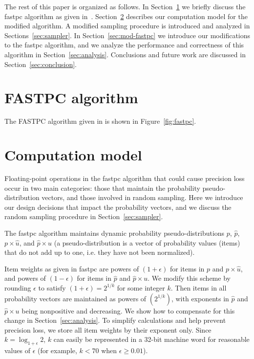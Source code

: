 \documentclass[11pt]{article}
\newcommand{\phat}{\hat{p}}
\newcommand{\phXu}{\hat{p} \times u}
\newcommand{\pXuh}{p \times \hat{u}}
\begin{document}
The rest of this paper is organized as follows.
 In Section~\ref{sec:fastpc} we briefly discuss the fastpc algorithm as given in~\cite{kouf2007}.
 Section~\ref{sec:model} describes our computation model for the modified algorithm. 
 A modified sampling procedure is introduced and analyzed in Sections~\ref{sec:sampler}.  
  In Section~\ref{sec:mod-fastpc} we introduce our modifications to the fastpc algorithm, 
  and we analyze the performance and correctness of this algorithm in Section~\ref{sec:analysis}.
 Conclusions and future work are discussed in Section~\ref{sec:conclusion}.

\section{FASTPC algorithm} \label{sec:fastpc}
The FASTPC algorithm given in \cite{kouf2007} is shown in Figure~\ref{fig:fastpc}.

\section{Computation model} \label{sec:model}

Floating-point operations in the fastpc algorithm that could cause precision loss occur in two main categories: those that maintain the probability pseudo-distribution vectors, and those involved in random sampling.  
Here we introduce our design decisions that impact the probability vectors, and we discuss the random sampling procedure in Section~\ref{sec:sampler}.

The fastpc algorithm maintains dynamic probability pseudo-distributions $p$, $\phat$, $\pXuh$, and $\phXu$ (a 
pseudo-distribution is a vector of probability values (items) that do not add
up to one, i.e. they have not been normalized).  

Item weights as given in fastpc are powers of $(1+\epsilon)$ for
items in $p$ and $\pXuh$, and powers of $(1-\epsilon)$
for items in $\phat$ and $\phXu$.  We modify
this scheme by rounding $\epsilon$ to satisfy $(1+\epsilon) = 2^{1/k}$ for 
some integer $k$. Then items in all probability vectors are maintained as powers of 
$(2^{1/k})$, with exponents in $\phat$ and
$\phXu$ being nonpositive and decreasing.  We show how to compensate for this 
change in Section~\ref{sec:analysis}.  To simplify calculations and
help prevent precision loss, we store all item weights by their exponent only.  Since $k = \log_{1+\epsilon}2$, $k$ can easily be represented in a 32-bit machine word for reasonable values of $\epsilon$ (for example, $k < 70$ when $\epsilon \ge 0.01$).  
\end{document}
